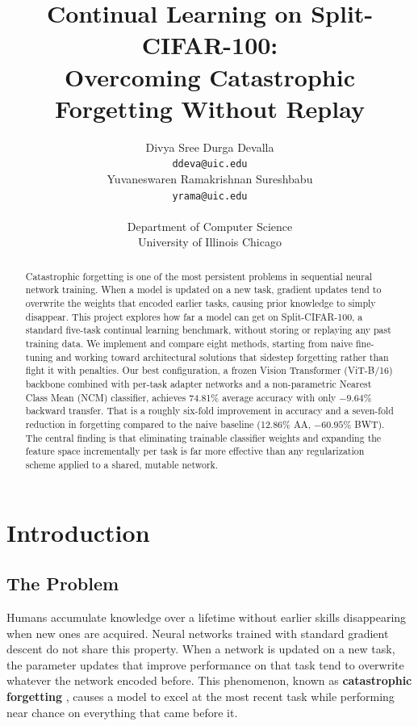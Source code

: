 \documentclass{article}
\title{Continual Learning on Split-CIFAR-100:\\
Overcoming Catastrophic Forgetting Without Replay}
\author{%
  \parbox[t]{0.4\linewidth}{\centering
    Divya Sree Durga Devalla \\
    \texttt{ddeva@uic.edu}
  }%
  \hfill
  \parbox[t]{0.4\linewidth}{\centering
    Yuvaneswaren Ramakrishnan Sureshbabu \\
    \texttt{yrama@uic.edu}
  }\\[8pt]
  \centering
  Department of Computer Science \\
  University of Illinois Chicago
}
\begin{document}
\maketitle

\begin{abstract}
Catastrophic forgetting is one of the most persistent problems in sequential
neural network training. When a model is updated on a new task, gradient updates
tend to overwrite the weights that encoded earlier tasks, causing prior knowledge
to simply disappear. This project explores how far a model can get on
Split-CIFAR-100, a standard five-task continual learning benchmark, without
storing or replaying any past training data. We implement and compare eight
methods, starting from naive fine-tuning and working toward architectural
solutions that sidestep forgetting rather than fight it with penalties. Our best
configuration, a frozen Vision Transformer (ViT-B/16) backbone combined with
per-task adapter networks and a non-parametric Nearest Class Mean (NCM)
classifier, achieves 74.81\% average accuracy with only $-9.64\%$ backward
transfer. That is a roughly six-fold improvement in accuracy and a seven-fold
reduction in forgetting compared to the naive baseline (12.86\% AA,
$-60.95\%$ BWT). The central finding is that eliminating trainable classifier
weights and expanding the feature space incrementally per task is far more
effective than any regularization scheme applied to a shared, mutable network.
\end{abstract}

\section{Introduction}
\label{sec:intro}

\subsection{The Problem}

Humans accumulate knowledge over a lifetime without earlier skills disappearing
when new ones are acquired. Neural networks trained with standard gradient
descent do not share this property. When a network is updated on a new task,
the parameter updates that improve performance on that task tend to overwrite
whatever the network encoded before. This phenomenon, known as
\textbf{catastrophic forgetting} \citep{kirkpatrick2017overcoming}, causes a
model to excel at the most recent task while performing near chance on everything
that came before it.
\end{document}
